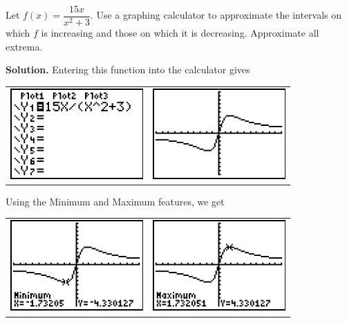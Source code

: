 \begin{ex}  Let $f(x) = \dfrac{15x}{x^2+3}$.  Use a graphing calculator to approximate the intervals on which $f$ is increasing and those on which it is decreasing.  Approximate all extrema.

\medskip

{\bf Solution.}  Entering this function into the calculator gives

\begin{center}

\begin{tabular}{cc}

\includegraphics[width=2in]{./RelationsandFunctionsGraphics/GraphsofFunctions11.jpg} \hspace{.75in} & \includegraphics[width=2in]{./RelationsandFunctionsGraphics/GraphsofFunctions12.jpg} \\

\end{tabular}

\end{center}

Using the Minimum and Maximum features, we get

\begin{center}

\begin{tabular}{cc}

\includegraphics[width=2in]{./RelationsandFunctionsGraphics/GraphsofFunctions13.jpg} \hspace{.75in} & \includegraphics[width=2in]{./RelationsandFunctionsGraphics/GraphsofFunctions14.jpg} \\


\end{tabular}
\end{center}
\end{ex}
